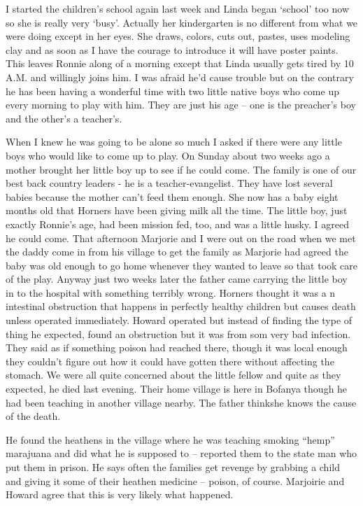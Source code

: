\documentclass[
]{book}
\begin{document}
I started the children's school again last week and Linda began `school' too now so she is really very `busy'. Actually her kindergarten is no different from what we were doing except in her eyes. She draws, colors, cuts out, pastes, uses modeling clay and as soon as I have the courage to introduce it will have poster paints. This leaves Ronnie along of a morning except that Linda usually gets tired by 10 A.M. and willingly joins him. I was afraid he'd cause trouble but on the contrary he has been having a wonderful time with two little native boys who come up every morning to play with him. They are just his age -- one is the preacher's boy and the other's a teacher's.

When I knew he was going to be alone so much I asked if there were any little boys who would like to come up to play. On Sunday about two weeks ago a mother brought her little boy up to see if he could come. The family is one of our best back country leaders - he is a teacher-evangelist. They have lost several babies because the mother can't feed them enough. She now has a baby eight months old that Horners have been giving milk all the time. The little boy, just exactly Ronnie's age, had been mission fed, too, and was a little husky. I agreed he could come. That afternoon Marjorie and I were out on the road when we met the daddy come in from his village to get the family as Marjorie had agreed the baby was old enough to go home whenever they wanted to leave so that took care of the play. Anyway just two weeks later the father came carrying the little boy in to the hospital with something terribly wrong. Horners thought it was a n intestinal obstruction that happens in perfectly healthy children but causes death unless operated immediately. Howard operated but instead of finding the type of thing he expected, found an obstruction but it was from som very bad infection. They said as if something poison had reached there, though it was local enough they couldn't figure out how it could have gotten there without affecting the stomach. We were all quite concerned about the little fellow and quite as they expected, he died last evening. Their home village is here in Bofanya though he had been teaching in another village nearby. The father thinkshe knows the cause of the death.

He found the heathens in the village where he was teaching smoking ``hemp'' marajuana and did what he is supposed to -- reported them to the state man who put them in prison. He says often the families get revenge by grabbing a child and giving it some of their heathen medicine -- poison, of course. Marjoirie and Howard agree that this is very likely what happened.
\end{document}
